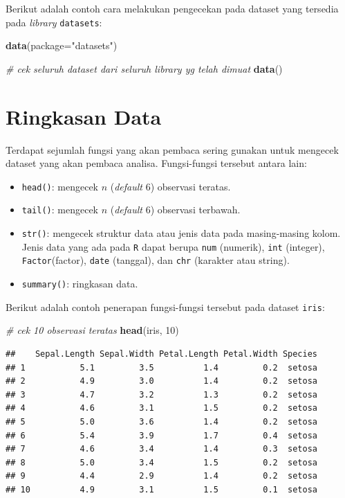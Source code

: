 \documentclass[]{book}
\newenvironment{Shaded}{\begin{snugshade}}{\end{snugshade}}
\newcommand{\CommentTok}[1]{\textcolor[rgb]{0.56,0.35,0.01}{\textit{#1}}}
\newcommand{\DataTypeTok}[1]{\textcolor[rgb]{0.13,0.29,0.53}{#1}}
\newcommand{\DecValTok}[1]{\textcolor[rgb]{0.00,0.00,0.81}{#1}}
\newcommand{\KeywordTok}[1]{\textcolor[rgb]{0.13,0.29,0.53}{\textbf{#1}}}
\newcommand{\NormalTok}[1]{#1}
\newcommand{\StringTok}[1]{\textcolor[rgb]{0.31,0.60,0.02}{#1}}
\providecommand{\tightlist}{%
  \setlength{\itemsep}{0pt}\setlength{\parskip}{0pt}}
\theoremstyle{definition}
\theoremstyle{definition}
\theoremstyle{definition}
\theoremstyle{remark}
\begin{document}
Berikut adalah contoh cara melakukan pengecekan pada dataset yang tersedia pada \emph{library} \texttt{datasets}:

\begin{Shaded}
\begin{Highlighting}[]
\KeywordTok{data}\NormalTok{(}\DataTypeTok{package=}\StringTok{"datasets"}\NormalTok{)}

\CommentTok{# cek seluruh dataset dari seluruh library yg telah dimuat}
\KeywordTok{data}\NormalTok{()}
\end{Highlighting}
\end{Shaded}

\hypertarget{summarystats}{%
\section{Ringkasan Data}\label{summarystats}}

Terdapat sejumlah fungsi yang akan pembaca sering gunakan untuk mengecek dataset yang akan pembaca analisa. Fungsi-fungsi tersebut antara lain:

\begin{itemize}
\tightlist
\item
  \texttt{head()}: mengecek \(n\) (\emph{default} 6) observasi teratas.
\item
  \texttt{tail()}: mengecek \(n\) (\emph{default} 6) observasi terbawah.
\item
  \texttt{str()}: mengecek struktur data atau jenis data pada masing-masing kolom. Jenis data yang ada pada \texttt{R} dapat berupa \texttt{num} (numerik), \texttt{int} (integer), \texttt{Factor}(factor), \texttt{date} (tanggal), dan \texttt{chr} (karakter atau string).
\item
  \texttt{summary()}: ringkasan data.
\end{itemize}

Berikut adalah contoh penerapan fungsi-fungsi tersebut pada dataset \texttt{iris}:

\begin{Shaded}
\begin{Highlighting}[]
\CommentTok{# cek 10 observasi teratas}
\KeywordTok{head}\NormalTok{(iris, }\DecValTok{10}\NormalTok{)}
\end{Highlighting}
\end{Shaded}

\begin{verbatim}
##    Sepal.Length Sepal.Width Petal.Length Petal.Width Species
## 1           5.1         3.5          1.4         0.2  setosa
## 2           4.9         3.0          1.4         0.2  setosa
## 3           4.7         3.2          1.3         0.2  setosa
## 4           4.6         3.1          1.5         0.2  setosa
## 5           5.0         3.6          1.4         0.2  setosa
## 6           5.4         3.9          1.7         0.4  setosa
## 7           4.6         3.4          1.4         0.3  setosa
## 8           5.0         3.4          1.5         0.2  setosa
## 9           4.4         2.9          1.4         0.2  setosa
## 10          4.9         3.1          1.5         0.1  setosa
\end{verbatim}
\end{document}
